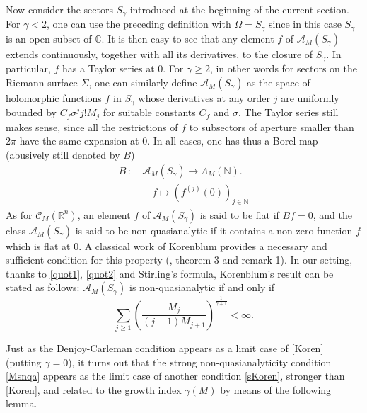 \documentclass[a4paper]{amsart}
\theoremstyle{plain}
\theoremstyle{definition}
\theoremstyle{remark}
\begin{document}
Now consider the sectors $ S_\gamma $ introduced at the beginning of the current section.
For $ \gamma<2 $, one can use the preceding definition with $ \Omega=S_\gamma $ since
in this case $ S_\gamma $ is an open subset of $ \mathbb{C} $. It is then easy to see that any element $ f $ of $ \mathcal{A}_M(S_\gamma) $
extends continuously, together with all its derivatives, to the closure
of $ S_\gamma $. In particular, $ f $ has a Taylor series at $ 0 $.
For $ \gamma\geq 2 $, in other words for sectors on the Riemann surface $ \Sigma $, one can  similarly define $ \mathcal{A}_M(S_\gamma) $ 
as the space of holomorphic functions $ f $ in $ S_\gamma $ whose derivatives at any order
$ j $ are uniformly bounded by $ C_f\sigma^jj!M_j $ for suitable constants $ C_f $ and
$ \sigma $. The Taylor series still makes sense, since all the restrictions
of $ f $ to subsectors of aperture smaller than $ 2\pi $ have the same
expansion at $ 0 $. In all cases, one has thus a Borel map 
(abusively still denoted by $ B $)
\begin{equation*}
\begin{split}
B\, :\ & \mathcal{A}_M(S_\gamma) \longrightarrow \Lambda_M(\mathbb{N}).\\
 &  \quad f\longmapsto (f^{(j)}(0))_{j\in\mathbb{N}}
\end{split}
\end{equation*}
As for $ \mathcal{C}_M(\mathbb{R}^n) $, an element $ f $ of
$ \mathcal{A}_M(S_\gamma) $ is said to be flat if $ Bf=0 $, and the class
$ \mathcal{A}_M(S_\gamma) $ is said to be non-quasianalytic if it contains a non-zero
function $ f $ which is flat at $ 0 $. A classical work of
Korenblum provides a necessary and sufficient condition for this property (\cite{Kor}, theorem 3 and remark 1). 
In our setting, thanks to \eqref{quot1}, \eqref{quot2} and Stirling's formula, Korenblum's result can be stated as follows: $ \mathcal{A}_M(S_\gamma) $ is non-quasianalytic if and only if  
\begin{equation}\label{Koren}
\sum_{j\geq 1}\left(\frac{M_j}{(j+1)M_{j+1}}\right)^{\frac{1}{\gamma+1}}<\infty.
\end{equation} 

Just as the Denjoy-Carleman condition appears as a limit case of \eqref{Koren} (putting $ \gamma=0 $), it turns out that the strong non-quasianalyticity condition \eqref{Msnqa} appears as the limit case of another condition \eqref{sKoren}, stronger than \eqref{Koren}, and related to the growth index $ \gamma(M) $  by means of the following lemma. 
 
\end{document}
